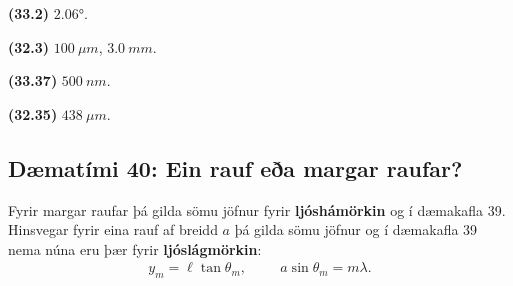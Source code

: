 \ifdefined \wholebook \else\documentclass[oneside]{book}\usepackage{EdlBook}\graphicspath{{figures/}}
\begin{document}
\begin{tcolorbox}
\begin{enumerate*}[label = ]
  \item \textbf{(33.2)} $\ang{2.06}$.
  \item \textbf{(32.3)} $\SI{100}{\mu m}$, $\SI{3.0}{mm}$.
  \item \textbf{(33.37)} $\SI{500}{nm}$.
  \item \textbf{(32.35)} $\SI{438}{\mu m}$.
\end{enumerate*}
\end{tcolorbox}

\newpage

\subsection*{Dæmatími 40: Ein rauf eða margar raufar?}

\begin{tcolorbox}
Fyrir margar raufar þá gilda sömu jöfnur fyrir \textbf{ljóshámörkin} og í dæmakafla 39. Hinsvegar fyrir eina rauf af breidd $a$ þá gilda sömu jöfnur og í dæmakafla 39 nema núna eru þær fyrir \textbf{ljóslágmörkin}:
\begin{align*}
    y_m = \ell \tan\theta_m, \hspace{1cm} a\sin\theta_m = m \lambda.
\end{align*}
\end{tcolorbox}
\end{document}
